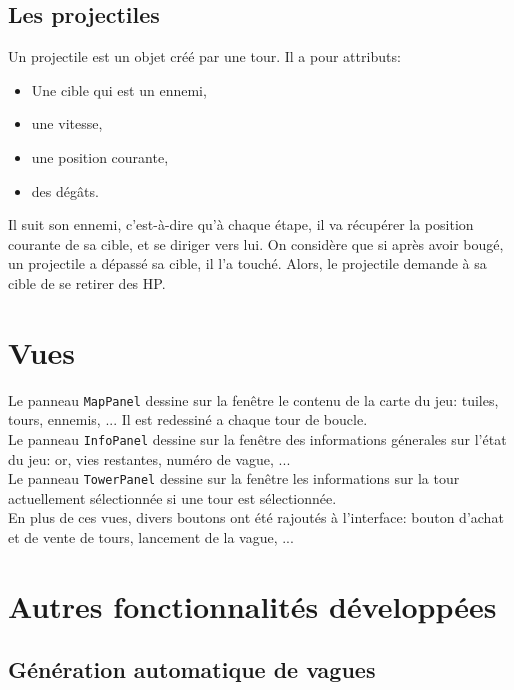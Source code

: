 \documentclass[a4paper,11pt]{article}
\begin{document}
\subsection{Les projectiles}

Un projectile est un objet créé par une tour. Il a pour attributs:
\begin{itemize}
    \item Une cible qui est un ennemi,
    \item une vitesse,
    \item une position courante,
    \item des dégâts.
\end{itemize}

Il suit son ennemi, c'est-à-dire qu'à chaque étape, il va récupérer la position
courante de sa cible, et se diriger vers lui. On considère que si après avoir bougé,
un projectile a dépassé sa cible, il l'a touché. Alors, le projectile demande à
sa cible de se retirer des HP.

\section{Vues}

Le panneau \texttt{MapPanel} dessine sur la fen\^etre le contenu de la carte du
jeu: tuiles, tours, ennemis, ... Il est redessin\'e a chaque tour de boucle. \\

\noindent Le panneau \texttt{InfoPanel} dessine sur la fen\^etre des informations g\'enerales
sur l'\'etat du jeu: or, vies restantes, num\'ero de vague, ... \\

\noindent Le panneau \texttt{TowerPanel} dessine sur la fen\^etre les informations sur
la tour actuellement s\'electionn\'ee si une tour est s\'electionn\'ee. \\

\noindent En plus de ces vues, divers boutons ont \'et\'e rajout\'es \`a
l'interface: bouton d'achat et de vente de tours, lancement de la vague, ...

\section{Autres fonctionnalités développées}

\subsection{Génération automatique de vagues}
\end{document}
